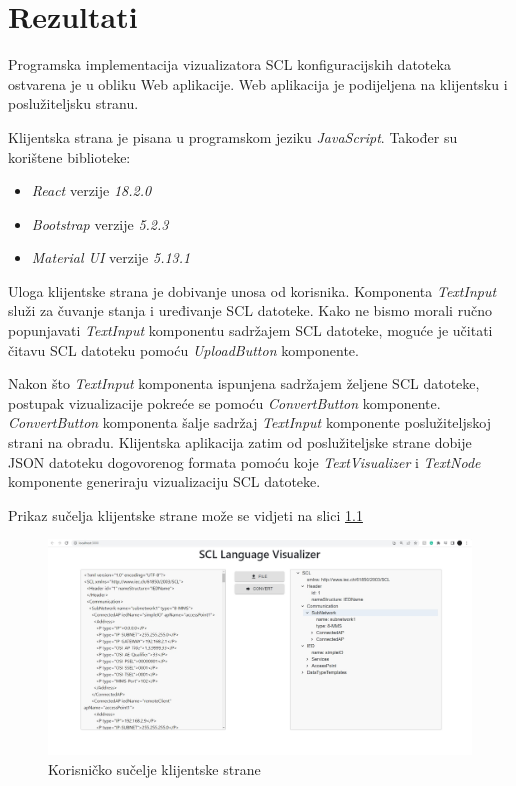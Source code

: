 \documentclass[times, utf8, zavrsni]{fer}
\begin{document}
\chapter{Rezultati}
Programska implementacija vizualizatora SCL konfiguracijskih datoteka ostvarena je u obliku Web aplikacije. Web aplikacija je podijeljena na klijentsku  i poslužiteljsku  stranu.

\bigskip

Klijentska strana je pisana u programskom jeziku \textit{JavaScript}. Također su korištene biblioteke:
\begin{itemize}
    \item \textit{React} verzije \textit{18.2.0}
    \item \textit{Bootstrap} verzije \textit{5.2.3}
    \item \textit{Material UI} verzije \textit{5.13.1}
\end{itemize}
Uloga klijentske strana je dobivanje unosa od korisnika. Komponenta \textit{TextInput} služi za čuvanje stanja i uređivanje SCL datoteke. Kako ne bismo morali ručno popunjavati \textit{TextInput} komponentu sadržajem SCL datoteke, moguće je učitati čitavu SCL datoteku pomoću \textit{UploadButton} komponente.

Nakon što \textit{TextInput} komponenta ispunjena sadržajem željene SCL datoteke, postupak vizualizacije pokreće se pomoću \textit{ConvertButton} komponente. \textit{ConvertButton} komponenta šalje sadržaj \textit{TextInput} komponente poslužiteljskoj strani na obradu. Klijentska aplikacija zatim od poslužiteljske strane dobije JSON datoteku dogovorenog formata pomoću koje \textit{TextVisualizer} i \textit{TextNode} komponente generiraju vizualizaciju SCL datoteke.

Prikaz sučelja klijentske strane može se vidjeti na slici \ref{fig:scl-interface}

\begin{figure}[tph]
    \centering
    \includegraphics[width=\textwidth]{img/SCL-Visualizer-interface.jpg}
    \caption{Korisničko sučelje klijentske strane}
    \label{fig:scl-interface}
\end{figure}
\end{document}
